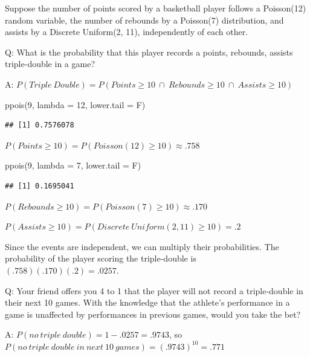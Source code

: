 \documentclass[
  11pt,
]{book}
\newenvironment{Shaded}{\begin{snugshade}}{\end{snugshade}}
\newcommand{\AttributeTok}[1]{\textcolor[rgb]{0.77,0.63,0.00}{#1}}
\newcommand{\DecValTok}[1]{\textcolor[rgb]{0.00,0.00,0.81}{#1}}
\newcommand{\FunctionTok}[1]{\textcolor[rgb]{0.00,0.00,0.00}{#1}}
\newcommand{\NormalTok}[1]{#1}
\theoremstyle{definition}
\theoremstyle{definition}
\theoremstyle{definition}
\theoremstyle{definition}
\theoremstyle{remark}
\begin{document}
Suppose the number of points scored by a basketball player follows a Poisson(12) random variable, the number of rebounds by a Poisson(7) distribution, and assists by a Discrete Uniform(2, 11), independently of each other.

Q: What is the probability that this player records a points, rebounds, assists triple-double in a game?

A: \(P(Triple\ Double) = P(Points \geq 10\ \cap\ Rebounds \geq 10\ \cap\ Assists \geq 10)\)

\begin{Shaded}
\begin{Highlighting}[]
\FunctionTok{ppois}\NormalTok{(}\DecValTok{9}\NormalTok{, }\AttributeTok{lambda =} \DecValTok{12}\NormalTok{, }\AttributeTok{lower.tail =}\NormalTok{ F)}
\end{Highlighting}
\end{Shaded}

\begin{verbatim}
## [1] 0.7576078
\end{verbatim}

\(P(Points \geq 10) = P(Poisson(12) \geq 10) \approx .758\)

\begin{Shaded}
\begin{Highlighting}[]
\FunctionTok{ppois}\NormalTok{(}\DecValTok{9}\NormalTok{, }\AttributeTok{lambda =} \DecValTok{7}\NormalTok{, }\AttributeTok{lower.tail =}\NormalTok{ F)}
\end{Highlighting}
\end{Shaded}

\begin{verbatim}
## [1] 0.1695041
\end{verbatim}

\(P(Rebounds \geq 10) = P(Poisson(7) \geq 10) \approx .170\)

\(P(Assists \geq 10) = P(Discrete\ Uniform(2, 11) \geq 10) = .2\)

Since the events are independent, we can multiply their probabilities. The probability of the player scoring the triple-double is \((.758)(.170)(.2) = .0257\).

Q: Your friend offers you 4 to 1 that the player will not record a triple-double in their next 10 games. With the knowledge that the athlete's performance in a game is unaffected by performances in previous games, would you take the bet?

A: \(P(no\ triple\ double) = 1 - .0257 = .9743\), so \(P(no\ triple\ double\ in\ next\ 10\ games) = (.9743)^{10} = .771\)
\end{document}
